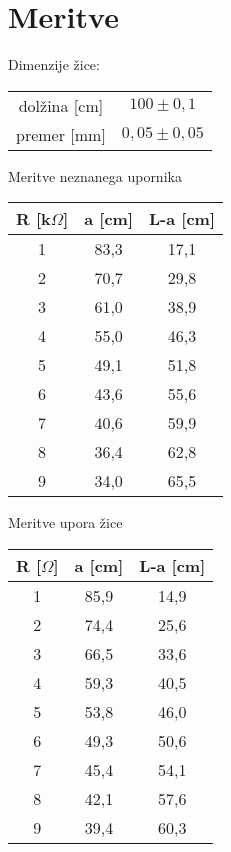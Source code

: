 \documentclass[a4paper]{report}
\begin{document}
\chapter*{Meritve}


  \begin{center}
   Dimenzije žice:\\
    \begin{tabular}{cc}
      dolžina  [cm] & $100 \pm 0,1$\\
      premer  [mm] & $0,05 \pm 0,05$\\
    \end{tabular}
  \end{center}



  \begin{center}
  Meritve neznanega upornika\\
    \begin{tabular}{|c|c|c|}
    \hline
      R [k$\Omega$] & a [cm] & L-a [cm]\\
      \hline
      1 & 83,3 & 17,1\\
      2 & 70,7 & 29,8\\
      3 & 61,0 & 38,9\\
      4 & 55,0 & 46,3\\
      5 & 49,1 & 51,8\\
      6 & 43,6 & 55,6\\
      7 & 40,6 & 59,9\\
      8 & 36,4 & 62,8\\
      9 & 34,0 & 65,5\\
      \hline
    \end{tabular}
  \end{center}



  \begin{center}
  Meritve upora žice\\
    \begin{tabular}{|c|c|c|}
    \hline
       R [$\Omega$] & a [cm] & L-a [cm]\\
      \hline
      1 & 85,9 & 14,9\\
      2 & 74,4 & 25,6\\
      3 & 66,5 & 33,6\\
      4 & 59,3 & 40,5\\
      5 & 53,8 & 46,0\\
      6 & 49,3 & 50,6\\
      7 & 45,4 & 54,1\\
      8 & 42,1 & 57,6\\
      9 & 39,4 & 60,3\\
      
      \hline    
    \end{tabular}
  \end{center}
\end{document}

